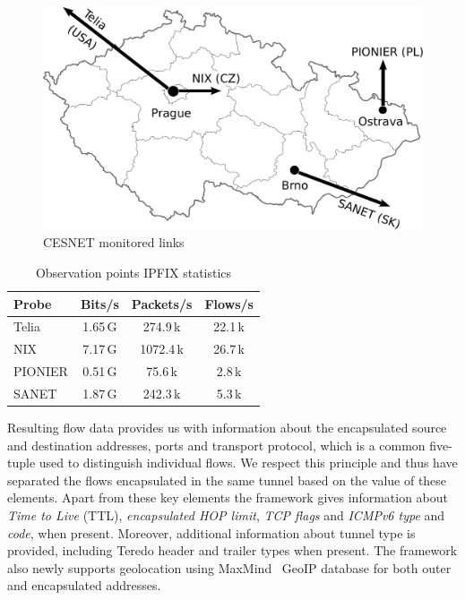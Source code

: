 \begin{figure}[!tb]
\centering
\includegraphics[width=0.9\linewidth]{figures/paper-tunnels/cesnet-map}
\caption{CESNET monitored links}
\label{fig:ipv6-tunnels-topology}
\end{figure}

\begin{table}[!tb]
\centering
        \begin{tabular}{lccc}
        \textbf{Probe} & \textbf{Bits/s} & \textbf{Packets/s} & \textbf{Flows/s} \\ \toprule 
        Telia & 1.65\,G & 274.9\,k & 22.1\,k \\
        NIX & 7.17\,G & 1072.4\,k & 26.7\,k \\
        PIONIER & 0.51\,G & 75.6\,k & 2.8\,k \\
        SANET & 1.87\,G & 242.3\,k & 5.3\,k \\ \bottomrule
        \end{tabular}
        \caption{Observation points IPFIX statistics}
        \label{tab:ipv6-tunnels-collected-data}
\end{table}

Resulting flow data provides us with information about the encapsulated source and destination addresses, ports and transport protocol, which is a common five-tuple used to distinguish individual flows. We respect this principle and thus have separated the flows encapsulated in the same tunnel based on the value of these elements. Apart from these key elements the framework gives information about \emph{Time to Live} (TTL), \emph{encapsulated HOP limit}, \emph{TCP flags} and \emph{ICMPv6 type} and \emph{code}, when present. Moreover, additional information about tunnel type is provided, including Teredo header and trailer types when present. The framework also newly supports geolocation using MaxMind~\cite{maxmind} GeoIP database for both outer and encapsulated addresses.

